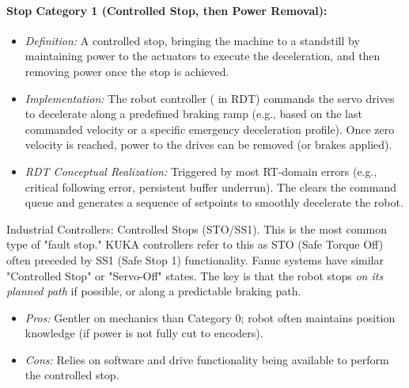 \paragraph{Stop Category 1 (Controlled Stop, then Power Removal):}
        \begin{itemize}
            \item \textit{Definition:} A controlled stop, bringing the machine to a standstill by maintaining power to the actuators to execute the deceleration, and then removing power once the stop is achieved.
            \item \textit{Implementation:} The robot controller ( in RDT) commands the servo drives to decelerate along a predefined braking ramp (e.g., based on the last commanded velocity or a specific emergency deceleration profile). Once zero velocity is reached, power to the drives can be removed (or brakes applied).
            \item \textit{RDT Conceptual Realization:} Triggered by most RT-domain errors (e.g., critical following error, persistent buffer underrun). The  clears the command queue and generates a sequence of setpoints to smoothly decelerate the robot.
        \end{itemize}
            \begin{tipbox}{Industrial Controllers: Controlled Stops (STO/SS1).}
    This is the most common type of "fault stop." KUKA controllers refer to this as STO (Safe Torque Off) often preceded by SS1 (Safe Stop 1) functionality. Fanuc systems have similar "Controlled Stop" or "Servo-Off" states. The key is that the robot stops \textit{on its planned path} if possible, or along a predictable braking path.
    \begin{itemize}
        \item \textit{Pros:} Gentler on mechanics than Category 0; robot often maintains position knowledge (if power is not fully cut to encoders).
        \item \textit{Cons:} Relies on software and drive functionality being available to perform the controlled stop.
    \end{itemize}
        \end{tipbox}


